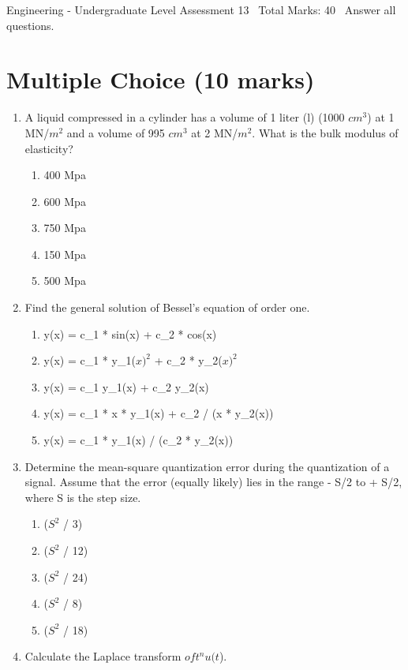 \documentclass[12pt]{article}
\begin{document}
\begin{center}
Engineering - Undergraduate Level Assessment 13 \
Total Marks: 40 \
Answer all questions.
\end{center}

\section*{Multiple Choice (10 marks)}
\begin{enumerate}[label=\arabic*.]
\item A liquid compressed in a cylinder has a volume of 1 liter (l) (1000 $cm^3$) at 1 MN/$m^2$ and a volume of 995 $cm^3$ at 2 MN/$m^2$. What is the bulk modulus of elasticity?
\begin{enumerate}[label=(\alph*)]
    \item 400 Mpa
    \item 600 Mpa
    \item 750 Mpa
    \item 150 Mpa
    \item 500 Mpa
\end{enumerate}
\item Find the general solution of Bessel's equation of order one.
\begin{enumerate}[label=(\alph*)]
    \item y(x) = c\_1 * sin(x) + c\_2 * cos(x)
    \item y(x) = c\_1 * y\_1($x)^2$ + c\_2 * y\_2($x)^2$
    \item y(x) = c\_1 y\_1(x) + c\_2 y\_2(x)
    \item y(x) = c\_1 * x * y\_1(x) + c\_2 / (x * y\_2(x))
    \item y(x) = c\_1 * y\_1(x) / (c\_2 * y\_2(x))
\end{enumerate}
\item Determine the mean-square quantization error during the quantization of a signal. Assume that the error (equally likely) lies in the range - S/2 to + S/2, where S is the step size.
\begin{enumerate}[label=(\alph*)]
    \item ($S^2$ / 3)
    \item ($S^2$ / 12)
    \item ($S^2$ / 24)
    \item ($S^2$ / 8)
    \item ($S^2$ / 18)
\end{enumerate}
\item Calculate the Laplace transform $oft^nu(t$).

\end{enumerate}
\end{document}
